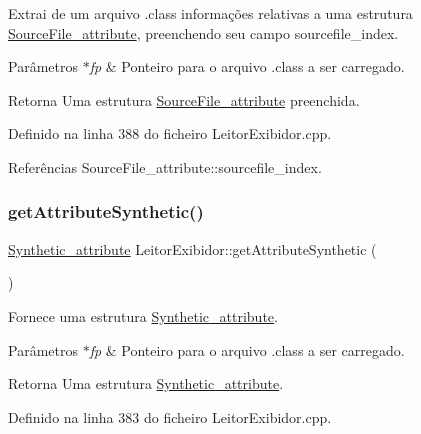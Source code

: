 Extrai de um arquivo .class informações relativas a uma estrutura \hyperlink{structSourceFile__attribute}{Source\+File\+\_\+attribute}, preenchendo seu campo sourcefile\+\_\+index. 
\begin{DoxyParams}{Parâmetros}
{\em $\ast$fp} & Ponteiro para o arquivo .class a ser carregado. \\
\hline
\end{DoxyParams}
\begin{DoxyReturn}{Retorna}
Uma estrutura \hyperlink{structSourceFile__attribute}{Source\+File\+\_\+attribute} preenchida. 
\end{DoxyReturn}


Definido na linha 388 do ficheiro Leitor\+Exibidor.\+cpp.



Referências Source\+File\+\_\+attribute\+::sourcefile\+\_\+index.

\mbox{\label{classLeitorExibidor_a9920aaaab4f9a67647977ffdbfe91b71}} 
\subsubsection{\texorpdfstring{get\+Attribute\+Synthetic()}{getAttributeSynthetic()}}
{\footnotesize\ttfamily \hyperlink{structSynthetic__attribute}{Synthetic\+\_\+attribute} Leitor\+Exibidor\+::get\+Attribute\+Synthetic (\begin{DoxyParamCaption}{ }\end{DoxyParamCaption})\hspace{0.3cm}{\ttfamily [private]}}

Fornece uma estrutura \hyperlink{structSynthetic__attribute}{Synthetic\+\_\+attribute}. 
\begin{DoxyParams}{Parâmetros}
{\em $\ast$fp} & Ponteiro para o arquivo .class a ser carregado. \\
\hline
\end{DoxyParams}
\begin{DoxyReturn}{Retorna}
Uma estrutura \hyperlink{structSynthetic__attribute}{Synthetic\+\_\+attribute}. 
\end{DoxyReturn}


Definido na linha 383 do ficheiro Leitor\+Exibidor.\+cpp.

\mbox{\label{classLeitorExibidor_a331d5d793343e29a8180771a4d2aa29c}} 
